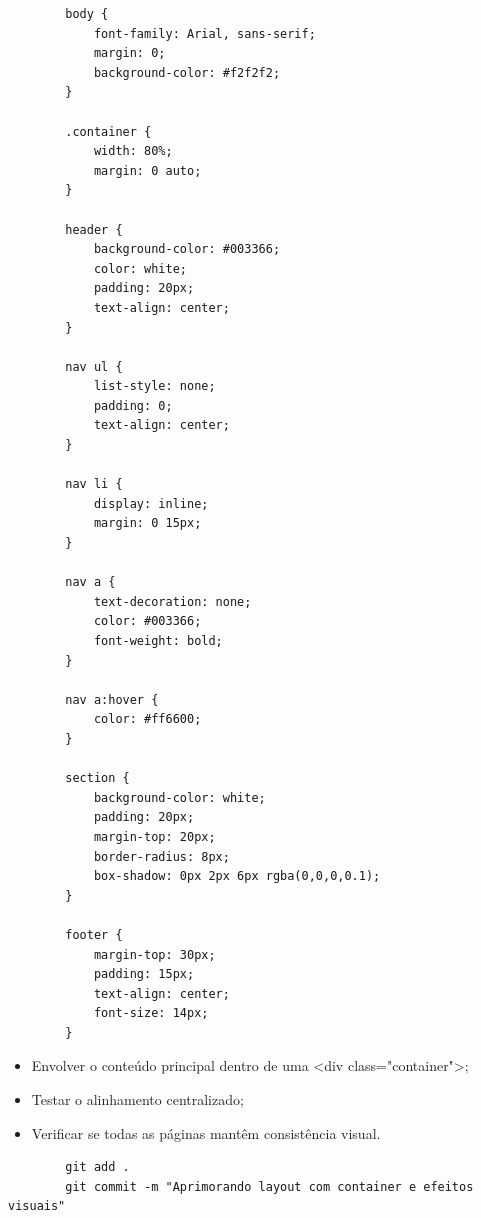 \documentclass[12pt,a4paper]{article}
\begin{document}
        \begin{boxCodigo}
        \begin{verbatim}
        body {
            font-family: Arial, sans-serif;
            margin: 0;
            background-color: #f2f2f2;
        }
        
        .container {
            width: 80%;
            margin: 0 auto;
        }
        
        header {
            background-color: #003366;
            color: white;
            padding: 20px;
            text-align: center;
        }
        
        nav ul {
            list-style: none;
            padding: 0;
            text-align: center;
        }
        
        nav li {
            display: inline;
            margin: 0 15px;
        }
        
        nav a {
            text-decoration: none;
            color: #003366;
            font-weight: bold;
        }
        
        nav a:hover {
            color: #ff6600;
        }
        
        section {
            background-color: white;
            padding: 20px;
            margin-top: 20px;
            border-radius: 8px;
            box-shadow: 0px 2px 6px rgba(0,0,0,0.1);
        }
        
        footer {
            margin-top: 30px;
            padding: 15px;
            text-align: center;
            font-size: 14px;
        }
        \end{verbatim}
        \end{boxCodigo}
        
        \begin{boxAtividade}
        
        \begin{itemize}
        \item Envolver o conteúdo principal dentro de uma <div class="container">;
        \item Testar o alinhamento centralizado;
        \item Verificar se todas as páginas mantêm consistência visual.
        \end{itemize}
        
        \end{boxAtividade}
        
        \begin{boxAtividade}
        
        \begin{boxCodigo}
        \begin{verbatim}
        git add .
        git commit -m "Aprimorando layout com container e efeitos visuais"
        \end{verbatim}
        \end{boxCodigo}
        
        \end{boxAtividade}
        
\end{document}
